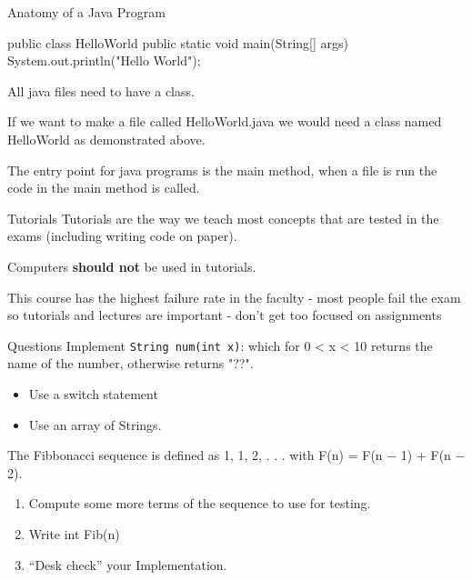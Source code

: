 \documentclass[week2]{csse2002}
\begin{document}
\begin{topic}{Anatomy of a Java Program}
\begin{java}
public class HelloWorld {
    public static void main(String[] args) {
        System.out.println("Hello World");
    }
}
\end{java}

All java files need to have a class.

If we want to make a file called HelloWorld.java we would need a class named HelloWorld as demonstrated above.

The entry point for java programs is the main method, when a file is run the code in the main method is called.
\end{topic}

\begin{topic}{Tutorials}
Tutorials are the way we teach most concepts that are tested in the exams (including writing code on paper).

Computers \textbf{should not} be used in tutorials.

This course has the highest failure rate in the faculty - most people fail the exam so tutorials and lectures are important - don't get too focused on assignments
\end{topic}

\begin{topic}{Questions}
Implement \texttt{String num(int x)}: which for 0 < x < 10 returns the name of the number, otherwise returns "??".
\begin{itemize}
	\item Use a switch statement
	\item Use an array of Strings.
\end{itemize}

The Fibbonacci sequence is defined as 1, 1, 2, . . . with F(n) = F(n − 1) + F(n − 2).
\begin{enumerate}
	\item Compute some more terms of the sequence to use for testing.
	\item Write int Fib(n)
	\item “Desk check” your Implementation.
\end{enumerate}
\end{topic}
\end{document}

